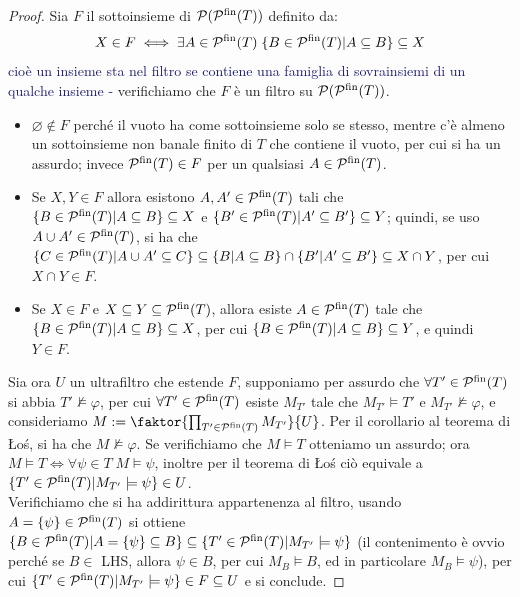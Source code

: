 \begin{proof}
    Sia $F$ il sottoinsieme di $\mathcal{P}(\mathcal{P}^{\text{fin}}(T))$ definito da:
    \[ X \in F \iff \exists A \in \mathcal{P}^{\text{fin}}(T) \; \{B \in \mathcal{P}^{\text{fin}}(T) | A \subseteq B\} \subseteq X
    \]
    \textcolor{MidnightBlue}{cioè un insieme sta nel filtro se contiene una famiglia di sovrainsiemi di un qualche insieme -} verifichiamo che $F$ è un filtro su $\mathcal{P}(\mathcal{P}^{\text{fin}}(T))$.
    \begin{itemize}
        \item $\varnothing \notin F$ perché il vuoto ha come sottoinsieme solo se stesso, mentre c'è almeno un sottoinsieme non banale finito di $T$ che contiene il vuoto, per cui si ha un assurdo; invece $\mathcal{P}^{\text{fin}}(T) \in F$ per un qualsiasi $A \in \mathcal{P}^{\text{fin}}(T)$.
        \item Se $X,Y \in F$ allora esistono $A,A' \in \mathcal{P}^{\text{fin}}(T)$ tali che $\{B \in \mathcal{P}^{\text{fin}}(T) | A \subseteq B\} \subseteq X$ e $\{B' \in \mathcal{P}^{\text{fin}}(T) | A' \subseteq B'\} \subseteq Y$; quindi, se uso $A \cup A' \in \mathcal{P}^{\text{fin}}(T)$, si ha che $\{C \in \mathcal{P}^{\text{fin}}(T) | A \cup A' \subseteq C\} \subseteq \{B | A \subseteq B\} \cap \{B' | A' \subseteq B'\} \subseteq X \cap Y$, per cui $X \cap Y \in F$.
        \item Se $X \in F$ e $X \subseteq Y \subseteq \mathcal{P}^{\text{fin}}(T)$, allora esiste $A \in \mathcal{P}^{\text{fin}}(T)$ tale che $\{B \in \mathcal{P}^{\text{fin}}(T) | A \subseteq B\} \subseteq X$, per cui $\{B \in \mathcal{P}^{\text{fin}}(T) | A \subseteq B\} \subseteq Y$, e quindi $Y \in F$.
    \end{itemize}
    Sia ora $U$ un ultrafiltro che estende $F$, supponiamo per assurdo che $\forall T' \in \mathcal{P}^{\text{fin}}(T)$ si abbia $T' \not \models \varphi$, per cui $\forall T' \in \mathcal{P}^{\text{fin}}(T)$ esiste $M_{T'}$ tale che $M_{T'} \models T'$ e $M_{T'} \not \models \varphi$, e consideriamo $M := \faktor{\prod_{T' \in \psf(T)} M_{T'}}{U}$.
    Per il corollario al teorema di Łoś, si ha che $M \not\models \varphi$.
    Se verifichiamo che $M \models T$ otteniamo un assurdo; ora $M \models T \iff \forall \psi \in T \; M \models \psi$, inoltre per il teorema di Łoś ciò equivale a $\{T' \in \mathcal{P}^{\text{fin}}(T) | M_{T'} \models \psi\} \in U$.\\
    Verifichiamo che si ha addirittura appartenenza al filtro, usando $A = \{\psi\} \in \mathcal{P}^{\text{fin}}(T)$ si ottiene $\{B \in \mathcal{P}^{\text{fin}}(T) | A = \{\psi\} \subseteq B\} \subseteq \{T' \in \mathcal{P}^{\text{fin}}(T) | M_{T'} \models \psi\}$ (il contenimento è ovvio perché se $B \in$ LHS, allora $\psi \in B$, per cui $M_B \models B$, ed in particolare $M_B \models \psi$), per cui $\{T' \in \mathcal{P}^{\text{fin}}(T) | M_{T'} \models \psi\} \in F \subseteq U$ e si conclude.
\end{proof}

